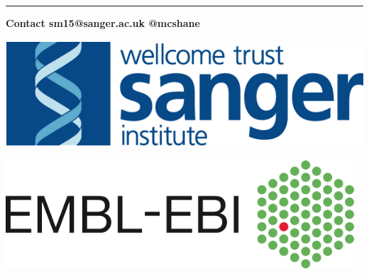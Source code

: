 \documentclass[a0,portrait]{a0poster}
\begin{document}
\begin{multicols}{2}

\end{multicols}

\vfill

\begin{center}\noindent\rule{1.0\linewidth}{0.05pt}\end{center}

\vfill

\noindent
\begin{minipage}[][][b]{0.4\textwidth}
\begin{tcolorbox}[boxsep=25pt,width=1.0\linewidth,colback=sangerlightblue3,arc=20pt]
\Large{
\color{sangertext}
\textbf{Contact
\hfill
sm15@sanger.ac.uk
\hfill
@mcshane
}}
\end{tcolorbox}
\end{minipage}%
\hfill%
\begin{minipage}[][][b]{0.25\textwidth}
    \centering
    \includegraphics[height=4cm]{images/wtsi}
\end{minipage}%
\hfill%
\begin{minipage}[][][b]{0.25\textwidth}
    \centering
    \includegraphics[height=4cm]{images/ebi}
\end{minipage}%
\end{document}
